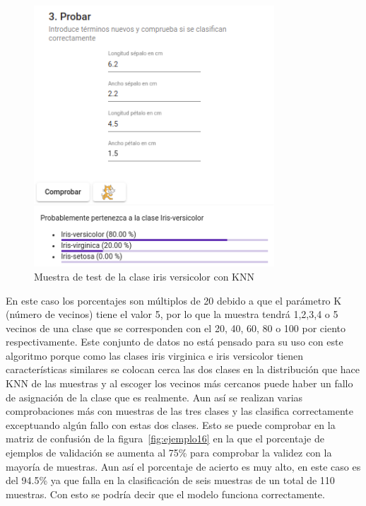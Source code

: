 \documentclass[a4paper, 12pt]{book}
\begin{document}
\begin{figure}
	\centering
	\includegraphics[width=9cm, keepaspectratio]{img/iris_ver_num_knn.png}
	\caption{Muestra de test de la clase iris versicolor con KNN} 	\label{fig:ejemplo15}
\end{figure}

En este caso los porcentajes son múltiplos de 20 debido a que el parámetro K (número de vecinos) tiene el valor 5, por lo que la muestra tendrá 1,2,3,4 o 5 vecinos de una clase que se corresponden con el 20, 40, 60, 80 o 100 por ciento respectivamente. Este conjunto de datos no está pensado para su uso con este algoritmo porque como las clases iris virginica e iris versicolor tienen características similares se colocan cerca las dos clases en la distribución que hace KNN de las muestras y al escoger los vecinos más cercanos puede haber un fallo de asignación de la clase que es realmente. Aun así se realizan varias comprobaciones más con muestras de las tres clases y las clasifica correctamente exceptuando algún fallo con estas dos clases. Esto se puede comprobar en la matriz de confusión de la figura~\ref{fig:ejemplo16} en la que el porcentaje de ejemplos de validación se aumenta al 75\% para comprobar la validez con la mayoría de muestras. 
Aun así el porcentaje de acierto es muy alto, en este caso es del 94.5\% ya que falla en la clasificación de seis muestras de un total de 110 muestras. Con esto se podría decir que el modelo funciona correctamente.
\end{document}

